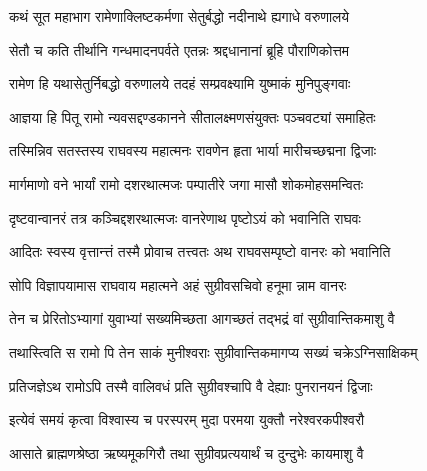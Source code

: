 
\vakta{}
\shrota{}
\tags{}
\notes{}

\storymeta





\twolineshloka
{कथं सूत महाभाग रामेणाक्लिष्टकर्मणा}
{सेतुर्बद्धो नदीनाथे ह्यगाधे वरुणालये}%

\twolineshloka
{सेतौ च कति तीर्थानि गन्धमादनपर्वते}
{एतन्नः श्रद्दधानानां ब्रूहि पौराणिकोत्तम}%


\twolineshloka
{रामेण हि यथासेतुर्निबद्धो वरुणालये}
{तदहं सम्प्रवक्ष्यामि युष्माकं मुनिपुङ्गवाः}%

\twolineshloka
{आज्ञया हि पितू रामो न्यवसद्दण्डकानने}
{सीतालक्ष्मणसंयुक्तः पञ्चवट्यां समाहितः}%

\twolineshloka
{तस्मिन्निव सतस्तस्य राघवस्य महात्मनः}
{रावणेन हृता भार्या मारीचच्छद्मना द्विजाः}%

\twolineshloka
{मार्गमाणो वने भार्यां रामो दशरथात्मजः}
{पम्पातीरे जगा मासौ शोकमोहसमन्वितः}%

\twolineshloka
{दृष्टवान्वानरं तत्र कञ्चिद्दशरथात्मजः}
{वानरेणाथ पृष्टोऽयं को भवानिति राघवः}%

\twolineshloka
{आदितः स्वस्य वृत्तान्त्तं तस्मै प्रोवाच तत्त्वतः}
{अथ राघवसम्पृष्टो वानरः को भवानिति}%

\twolineshloka
{सोपि विज्ञापयामास राघवाय महात्मने}
{अहं सुग्रीवसचिवो हनूमा न्नाम वानरः}%

\twolineshloka
{तेन च प्रेरितोऽभ्यागां युवाभ्यां सख्यमिच्छता}
{आगच्छतं तद्भद्रं वां सुग्रीवान्तिकमाशु वै}%

\twolineshloka
{तथास्त्विति स रामो पि तेन साकं मुनीश्वराः}
{सुग्रीवान्तिकमागप्य सख्यं चक्रेऽग्निसाक्षिकम्}%

\twolineshloka
{प्रतिजज्ञेऽथ रामोऽपि तस्मै वालिवधं प्रति}
{सुग्रीवश्चापि वै देह्याः पुनरानयनं द्विजाः}%

\twolineshloka
{इत्येवं समयं कृत्वा विश्वास्य च परस्परम्}
{मुदा परमया युक्तौ नरेश्वरकपीश्वरौ}%

\twolineshloka
{आसाते ब्राह्मणश्रेष्ठा ऋष्यमूकगिरौ तथा}
{सुग्रीवप्रत्ययार्थं च दुन्दुभेः कायमाशु वै}%

